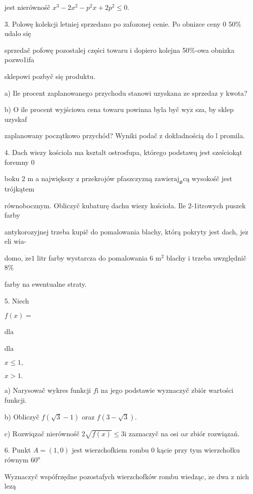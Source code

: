 \documentclass[a4paper,12pt]{article}
\begin{document}
jest nierównośč $x^{3}-2x^{2}-p^{2}x+2p^{2}\leq 0.$

3. Polowę kolekcji letniej sprzedano po zafozonej cenie. Po obnizce ceny $0$ 50\% udalo się

sprzedač pofowę pozostalej części towaru $\mathrm{i}$ dopiero kolejna 50\%-owa obnizka pozwo1ifa

sklepowi pozbyč się produktu.

a) Ile procent zaplanowanego przychodu stanowi uzyskana ze sprzedaz $\mathrm{y}$ kwota?

b) $\mathrm{O}$ ile procent wyjściowa cena towaru powinna byla byč $\mathrm{w}\mathrm{y}\dot{\mathrm{z}}$ sza, by sklep uzyskaf

zaplanowany początkowo przychód? Wyniki podač $\mathrm{z}$ dokładnością do l promila.

4. Dach wiezy kościola ma ksztalt ostrosfupa, którego podstawq jest sześciokąt foremny $0$

boku 2 $\mathrm{m}$ a największy $\mathrm{z}$ przekrojów pfaszczyzną $\mathrm{z}\mathrm{a}\mathrm{w}\mathrm{i}\mathrm{e}\mathrm{r}\mathrm{a}\mathrm{j}_{\Phi}\mathrm{c}\text{ą}$ wysokośč jest trójkątem

równobocznym. Obliczyč kubaturę dachu wiezy kościoła. Ile 2-1itrowych puszek farby

antykorozyjnej trzeba kupič do pomalowania blachy, którą pokryty jest dach, $\mathrm{j}\mathrm{e}\dot{\mathrm{z}}$ eli wia-

domo, $\dot{\mathrm{z}}\mathrm{e} 1$ litr farby wystarcza do pomalowania 6 $\mathrm{m}^{2}$ blachy $\mathrm{i}$ trzeba uwzględnič 8\%

farby na ewentualne straty.

5. Niech

$f(x)=$

dla

dla

$x\leq 1,$

$x>1.$

a) Narysowač wykres funkcji $f\mathrm{i}$ na jego podstawie wyznaczyč zbiór wartości funkcji.

b) Obliczyč $f(\sqrt{3}-1)$ oraz $f(3-\sqrt{3}).$

c) Rozwiqzač nierównośč $2\sqrt{f(x)}\leq 3\mathrm{i}$ zaznaczyč na osi $\mathrm{o}x$ zbiór rozwiązań.

6. Punkt $A=(1,0)$ jest wierzchofkiem rombu $0$ kącie przy tym wierzchołku równym $60^{\mathrm{o}}$

Wyznaczyč wspófrzędne pozostafych wierzchofków rombu wiedząc, $\dot{\mathrm{z}}\mathrm{e}$ dwa $\mathrm{z}$ nich lezą
\end{document}
